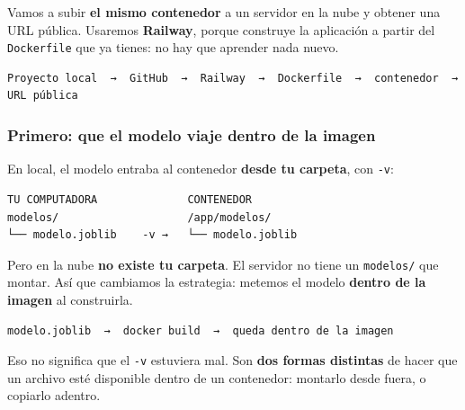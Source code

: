 \documentclass[
]{article}
\begin{document}
Vamos a subir \textbf{el mismo contenedor} a un servidor en la nube y
obtener una URL pública. Usaremos \textbf{Railway}, porque construye la
aplicación a partir del \texttt{Dockerfile} que ya tienes: no hay que
aprender nada nuevo.

\begin{verbatim}
Proyecto local  →  GitHub  →  Railway  →  Dockerfile  →  contenedor  →  URL pública
\end{verbatim}

\protect{}\label{4678b3c6}
\subsubsection{Primero: que el modelo viaje dentro de la
imagen}\label{primero-que-el-modelo-viaje-dentro-de-la-imagen}

En local, el modelo entraba al contenedor \textbf{desde tu carpeta}, con
\texttt{-v}:

\begin{verbatim}
TU COMPUTADORA              CONTENEDOR
modelos/                    /app/modelos/
└── modelo.joblib    -v →   └── modelo.joblib
\end{verbatim}

Pero en la nube \textbf{no existe tu carpeta}. El servidor no tiene un
\texttt{modelos/} que montar. Así que cambiamos la estrategia: metemos
el modelo \textbf{dentro de la imagen} al construirla.

\begin{verbatim}
modelo.joblib  →  docker build  →  queda dentro de la imagen
\end{verbatim}

Eso no significa que el \texttt{-v} estuviera mal. Son \textbf{dos
formas distintas} de hacer que un archivo esté disponible dentro de un
contenedor: montarlo desde fuera, o copiarlo adentro.
\end{document}
